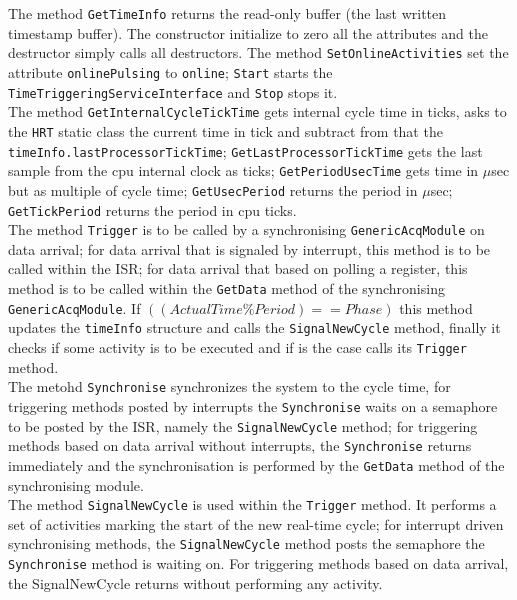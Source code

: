 The method \texttt{GetTimeInfo} returns the read-only buffer (the last written timestamp buffer). The constructor initialize to zero all the attributes and the destructor simply calls all destructors. The method \texttt{SetOnlineActivities} set the attribute \texttt{onlinePulsing} to \texttt{online}; \texttt{Start} starts the \texttt{TimeTriggeringServiceInterface} and \texttt{Stop} stops it. \\


The method \texttt{GetInternalCycleTickTime} gets internal cycle time in ticks, asks to the \texttt{HRT} static class the current time in tick and subtract from that the \texttt{timeInfo.lastProcessorTickTime}; \texttt{GetLastProcessorTickTime} gets the last sample from the cpu internal clock as ticks; \texttt{GetPeriodUsecTime} gets time in $\mu$sec but as multiple of cycle time; \texttt{GetUsecPeriod} returns the period in $\mu$sec; \texttt{GetTickPeriod} returns the period in cpu ticks. \\


The method \texttt{Trigger} is to be called by a synchronising \texttt{GenericAcqModule} on data arrival; for data arrival that is signaled by interrupt, this method is to be called within the ISR; for data arrival that based on polling a register, this method is to be called within the \texttt{GetData} method of the synchronising \texttt{GenericAcqModule}. If $((ActualTime \% Period) == Phase)$ this method updates the \texttt{timeInfo} structure and calls the \texttt{SignalNewCycle} method, finally it checks if some activity is to be executed and if is the case calls its \texttt{Trigger} method. \\


The metohd \texttt{Synchronise} synchronizes the system to the cycle time, for triggering methods posted by interrupts the \texttt{Synchronise} waits on a semaphore to be posted by the ISR, namely the \texttt{SignalNewCycle} method; for triggering methods based on data arrival without interrupts, the \texttt{Synchronise} returns immediately  and the synchronisation is performed by the \texttt{GetData} method of the synchronising module. \\


The method \texttt{SignalNewCycle} is used within the \texttt{Trigger} method. It performs a set of activities marking the start of the new real-time cycle; for interrupt driven synchronising methods, the \texttt{SignalNewCycle} method posts the semaphore the \texttt{Synchronise} method is waiting on. For triggering methods based on data arrival, the SignalNewCycle returns without performing any activity.

